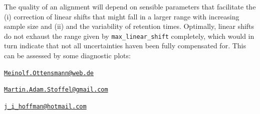 The quality of an alignment will depend on sensible parameters that
facilitate the (i) correction of linear shifts that might fall in a
larger range with increasing sample size and (ii) and the variability of
retention times. Optimally, linear shifts do not exhaust the range given
by \texttt{max\_linear\_shift} completely, which would in turn indicate
that not all uncertainties haven been fully compensated for. This can be
assessed by some diagnostic plots:



\address{%
Meinolf Ottensmann\\
Department of Animal Behaviour\\
Bielefeld University\\ Morgenbreede 45\\ 33615 Bielefeld\\
}
\href{mailto:Meinolf.Ottensmann@web.de}{\nolinkurl{Meinolf.Ottensmann@web.de}}

\address{%
Martin A. Stoffel\\
Department of Animal Behaviour\\
Bielefeld University\\ Morgenbreede 45\\ 33615 Bielefeld\\
}
\href{mailto:Martin.Adam.Stoffel@gmail.com}{\nolinkurl{Martin.Adam.Stoffel@gmail.com}}

\address{%
Joseph I. Hoffman\\
Department of Animal Behaviour\\
Bielefeld University\\ Morgenbreede 45\\ 33615 Bielefeld\\
}
\href{mailto:j_i_hoffman@hotmail.com}{\nolinkurl{j\_i\_hoffman@hotmail.com}}

